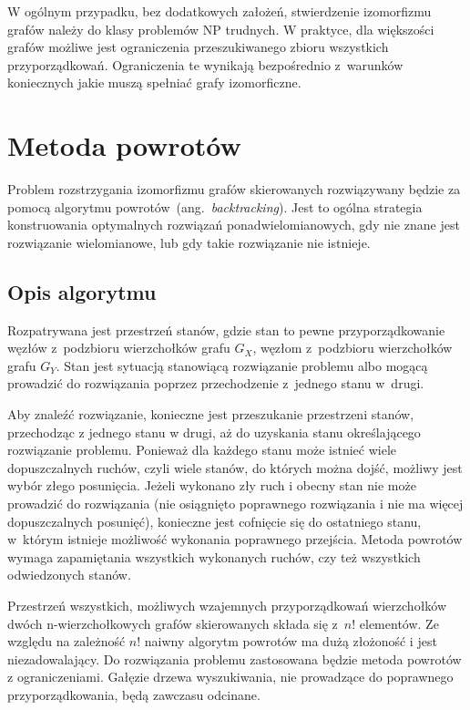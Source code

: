 \documentclass[12pt, a4paper, ]{article} %
\begin{document}
W ogólnym przypadku, bez dodatkowych założeń, stwierdzenie izomorfizmu grafów należy do
klasy problemów NP trudnych. W praktyce, dla większości grafów możliwe
jest ograniczenia przeszukiwanego zbioru wszystkich przyporządkowań.
Ograniczenia te wynikają bezpośrednio z~warunków koniecznych jakie muszą
spełniać grafy izomorficzne.

\section{Metoda powrotów}

Problem rozstrzygania izomorfizmu grafów skierowanych rozwiązywany będzie za
pomocą algorytmu powrotów~(ang.\ \textit{backtracking}). Jest to ogólna strategia
konstruowania optymalnych rozwiązań ponadwielomianowych, gdy nie znane jest
rozwiązanie wielomianowe, lub gdy takie rozwiązanie nie istnieje.

\subsection{Opis algorytmu}

Rozpatrywana jest przestrzeń stanów, gdzie stan to pewne przyporządkowanie węzłów z~podzbioru
wierzchołków grafu $G_{X}$, węzłom z~podzbioru wierzchołków grafu $G_{Y}$. Stan jest sytuacją
stanowiącą rozwiązanie problemu albo mogącą prowadzić do rozwiązania poprzez przechodzenie
z~jednego stanu w~drugi.

Aby znaleźć rozwiązanie, konieczne jest przeszukanie przestrzeni stanów,
przechodząc z jednego stanu w drugi, aż do uzyskania stanu określającego
rozwiązanie problemu. Ponieważ dla każdego stanu może istnieć wiele
dopuszczalnych ruchów, czyli wiele stanów, do których można dojść, możliwy jest
wybór złego posunięcia. Jeżeli wykonano zły ruch i obecny stan nie może
prowadzić do rozwiązania (nie osiągnięto poprawnego rozwiązania i nie ma więcej
dopuszczalnych posunięć), konieczne jest cofnięcie się do ostatniego stanu,
w~którym istnieje możliwość wykonania poprawnego przejścia. Metoda powrotów
wymaga zapamiętania wszystkich wykonanych ruchów, czy też wszystkich
odwiedzonych stanów.

Przestrzeń wszystkich, możliwych wzajemnych przyporządkowań wierzchołków dwóch
n-wierz\-choł\-ko\-wych grafów skierowanych składa się z~$ n! $ elementów. Ze względu
na zależność $ n! $ naiwny algorytm powrotów ma dużą złożoność i jest
niezadowalający. Do rozwiązania problemu zastosowana będzie metoda powrotów z
ograniczeniami. Gałęzie drzewa wyszukiwania, nie prowadzące do poprawnego
przyporządkowania, będą zawczasu odcinane.
\end{document}
